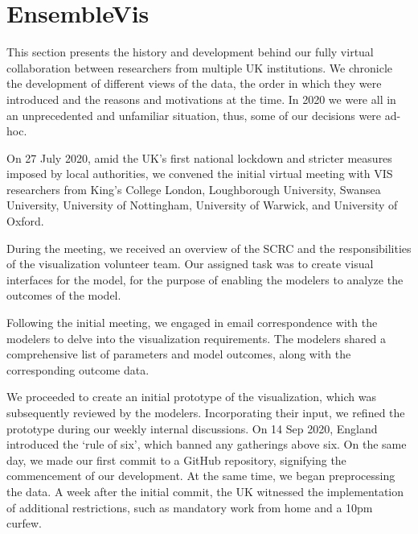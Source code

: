 \section{EnsembleVis}
\label{sec:EnsembleVis}

This section presents the history and development behind our fully virtual collaboration between researchers from multiple UK institutions.
We chronicle the development of different views of the data, the order in which they were introduced and the reasons and motivations at the time.
In 2020 we were all in an unprecedented and unfamiliar situation, thus, some of our decisions were ad-hoc.


\label{subsec:InitialMeeting}
On 27 July 2020, amid the UK's first national lockdown and stricter measures imposed by local authorities, we convened the initial virtual meeting with VIS researchers from King's College London, Loughborough University, Swansea University, University of Nottingham, University of Warwick, and University of Oxford.

During the meeting, we received an overview of the SCRC and the responsibilities of the visualization volunteer team.
Our assigned task was to create visual interfaces for the model, for the purpose of enabling the modelers to analyze the outcomes of the model.

Following the initial meeting, we engaged in email correspondence with the modelers to delve into the visualization requirements. The modelers shared a comprehensive list of parameters and model outcomes, along with the corresponding outcome data.


We proceeded to create an initial prototype of the visualization, which was subsequently reviewed by the modelers.
Incorporating their input, we refined the prototype during our weekly internal discussions.
On 14 Sep 2020, England introduced the `rule of six', which banned any gatherings above six.
On the same day, we made our first commit to a GitHub repository, signifying the commencement of our development.
At the same time, we began preprocessing the data.
A week after the initial commit, the UK witnessed the implementation of additional restrictions, such as mandatory work from home and a 10pm curfew.

